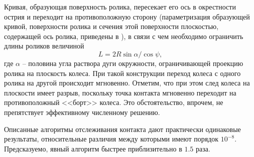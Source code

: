 Кривая, образующая поверхность ролика, пересекает его ось в окрестности острия и переходит на противоположную сторону (параметризация образующей кривой, поверхности ролика и сечения этой поверхности плоскостью, содержащей ось ролика, приведены в \cite{Gfrerrer2008}), в связи с чем
необходимо ограничить длины роликов величиной
$$
L=2R\sin\alpha / \cos\psi,
$$
где $\alpha$ -- половина угла раствора дуги окружности, ограничивающей проекцию ролика на плоскость колеса.
При такой конструкции переход колеса с одного ролика на другой происходит мгновенно.
Отметим, что при этом след колеса на плоскости имеет разрыв, поскольку точка контакта мгновенно переходит на противоположный <<борт>> колеса. Это обстоятельство, впрочем, не препятствует эффективному численному решению.

Описанные алгоритмы отслеживания контакта дают практически одинаковые результаты, относительные различия между которыми имеют порядок $10^{-8}$. Предсказуемо, явный алгоритм быстрее приблизительно в $1.5$ раза.
